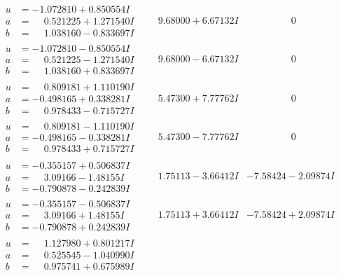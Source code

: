 \documentclass[1p]{elsarticle_modified}
\theoremstyle{definition}
\begin{document}
$$\begin{array}{c|c|c}
\begin{aligned}
u &= -1.072810 + 0.850554 I \\
a &= \phantom{-}0.521225 + 1.271540 I \\
b &= \phantom{-}1.038160 - 0.833697 I\end{aligned}
 & \phantom{-}9.68000 + 6.67132 I & \phantom{-0.000000 } 0 \\ \hline\begin{aligned}
u &= -1.072810 - 0.850554 I \\
a &= \phantom{-}0.521225 - 1.271540 I \\
b &= \phantom{-}1.038160 + 0.833697 I\end{aligned}
 & \phantom{-}9.68000 - 6.67132 I & \phantom{-0.000000 } 0 \\ \hline\begin{aligned}
u &= \phantom{-}0.809181 + 1.110190 I \\
a &= -0.498165 + 0.338281 I \\
b &= \phantom{-}0.978433 - 0.715727 I\end{aligned}
 & \phantom{-}5.47300 + 7.77762 I & \phantom{-0.000000 } 0 \\ \hline\begin{aligned}
u &= \phantom{-}0.809181 - 1.110190 I \\
a &= -0.498165 - 0.338281 I \\
b &= \phantom{-}0.978433 + 0.715727 I\end{aligned}
 & \phantom{-}5.47300 - 7.77762 I & \phantom{-0.000000 } 0 \\ \hline\begin{aligned}
u &= -0.355157 + 0.506837 I \\
a &= \phantom{-}3.09166 - 1.48155 I \\
b &= -0.790878 - 0.242839 I\end{aligned}
 & \phantom{-}1.75113 - 3.66412 I & -7.58424 - 2.09874 I \\ \hline\begin{aligned}
u &= -0.355157 - 0.506837 I \\
a &= \phantom{-}3.09166 + 1.48155 I \\
b &= -0.790878 + 0.242839 I\end{aligned}
 & \phantom{-}1.75113 + 3.66412 I & -7.58424 + 2.09874 I \\ \hline\begin{aligned}
u &= \phantom{-}1.127980 + 0.801217 I \\
a &= \phantom{-}0.525545 - 1.040990 I \\
b &= \phantom{-}0.975741 + 0.675989 I\end{aligned}

\end{array}$$
\end{document}
